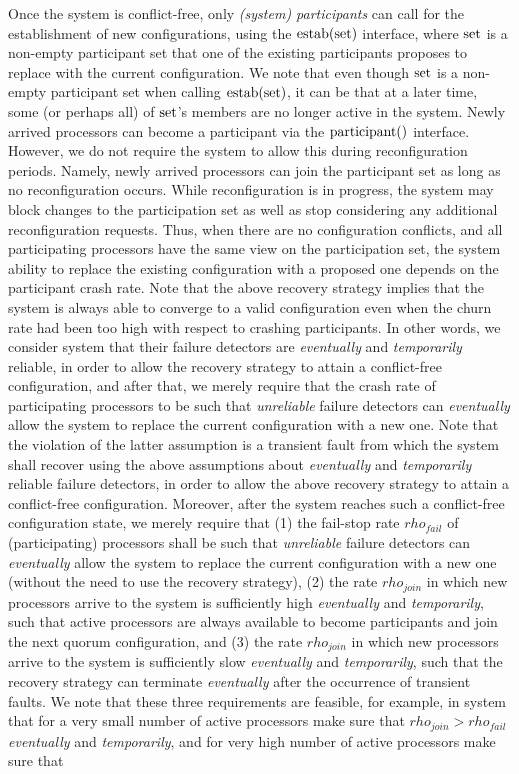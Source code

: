 \documentclass[11pt]{article}
\newcommand{\configEstab}{estab}
\begin{document}
{Once the system is conflict-free, only \emph{(system) participants} can call for the establishment of new configurations, using the $\textnormal{\configEstab}(\textnormal{set})$ interface, where $\textnormal{set}$ is a non-empty participant set that one of the existing participants proposes to replace with the current configuration. We note that even though $\textnormal{set}$ is a non-empty participant set when calling $\textnormal{\configEstab}(\textnormal{set})$, it can be that at a later time, some (or perhaps all) of $\textnormal{set}$'s members are no longer active in the system. Newly arrived processors can become a participant via the $\textnormal{participant}()$ interface. However, we do not require the system to allow this during reconfiguration periods. Namely, newly arrived processors can join the participant set as long as no reconfiguration occurs. While reconfiguration is in progress, the system may block changes to the participation set as well as stop considering any additional reconfiguration requests. Thus, when there are no configuration conflicts, and all participating processors have the same view on the participation set, the system ability to replace the existing configuration with a proposed one depends on the participant crash rate. Note that the above recovery strategy implies that the system is always able to converge to a valid configuration even when the churn rate had been too high with respect to crashing participants. In other words, we consider system that their failure detectors are \emph{eventually} and \emph{temporarily} reliable, in order to allow the recovery strategy to attain a conflict-free configuration, and after that, we merely require that the crash rate of participating processors to be such that \emph{unreliable} failure detectors can \emph{eventually} allow the system to replace the current configuration with a new one. Note that the violation of the latter assumption is a transient fault from which the system shall recover using the above assumptions about \emph{eventually} and \emph{temporarily} reliable failure detectors, in order to allow the above recovery strategy to attain a conflict-free configuration. Moreover, after the system reaches such a conflict-free configuration state, we merely require that (1) the fail-stop rate $rho_{fail}$ of (participating) processors shall be such that \emph{unreliable} failure detectors can \emph{eventually} allow the system to replace the current configuration with a new one (without the need to use the recovery strategy), (2) the rate $rho_{join}$ in which new processors arrive to the system is sufficiently high \emph{eventually} and \emph{temporarily}, such that active processors are always available to become participants and join the next quorum configuration, and (3) the rate $rho_{join}$ in which new processors arrive to the system is sufficiently slow \emph{eventually} and \emph{temporarily}, such that the recovery strategy can terminate \emph{eventually} after the occurrence of transient faults. We note that these three requirements are feasible, for example, in system that for a very small number of active processors make sure that $rho_{join}>rho_{fail}$ \emph{eventually} and \emph{temporarily}, and for very high number of active processors make sure that }
\end{document}
